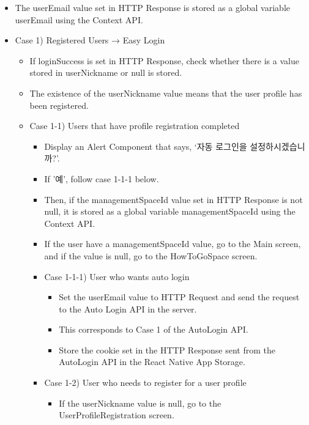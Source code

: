 \documentclass[conference]{IEEEtran}
\begin{document}
\begin{itemize}
\begin{itemize}
        \item The userEmail value set in HTTP Response is stored as a global variable userEmail using the Context API.
        \item Case 1) Registered Users → Easy Login
        \begin{itemize}
            \item If loginSuccess is set in HTTP Response, check whether there is a value stored in userNickname or null is stored.
            \item The existence of the userNickname value means that the user profile has been registered.
            \item Case 1-1) Users that have profile registration completed
            \begin{itemize}
                \item Display an Alert Component that says, ‘자동 로그인을 설정하시겠습니까?’.
                \item If '예', follow case 1-1-1 below.
                \item Then, if the managementSpaceId value set in HTTP Response is not null, it is stored as a global variable managementSpaceId using the Context API.
                \item If the user have a managementSpaceId value, go to the Main screen, and if the value is null, go to the HowToGoSpace screen.
                \item Case 1-1-1) User who wants auto login
                \begin{itemize}
                    \item Set the userEmail value to HTTP Request and send the request to the Auto Login API in the server.
                    \item This corresponds to Case 1 of the AutoLogin API.
                    \item Store the cookie set in the HTTP Response sent from the AutoLogin API in the React Native App Storage.
                \end{itemize}
            \end{itemize}
            \begin{itemize}
                \item Case 1-2) User who needs to register for a user profile
                \begin{itemize}
                    \item If the userNickname value is null, go to the UserProfileRegistration screen.
                \end{itemize}

\end{itemize}
\end{itemize}
\end{itemize}
\end{itemize}
\end{document}
